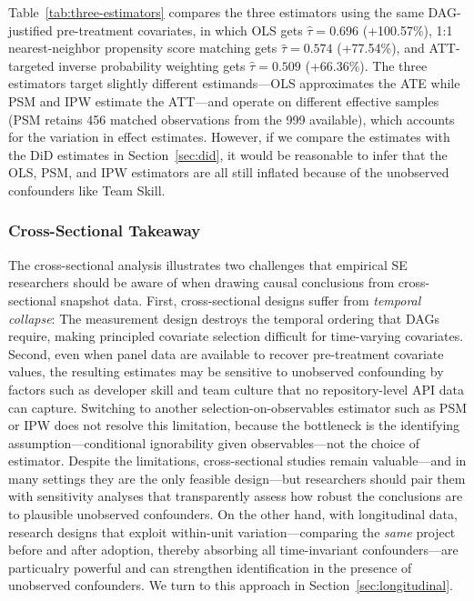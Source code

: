 Table~\ref{tab:three-estimators} compares the three estimators using the same DAG-justified pre-treatment covariates, in which OLS gets $\hat{\tau} = 0.696$ (+100.57\%), 1:1 nearest-neighbor propensity score matching gets $\hat{\tau} = 0.574$ (+77.54\%), and ATT-targeted inverse probability weighting gets $\hat{\tau} = 0.509$ (+66.36\%).
The three estimators target slightly different estimands---OLS approximates the ATE while PSM and IPW estimate the ATT---and operate on different effective samples (PSM retains 456 matched observations from the 999 available), which accounts for the variation in effect estimates.
However, if we compare the estimates with the DiD estimates in Section~\ref{sec:did}, it would be reasonable to infer that the OLS, PSM, and IPW estimators are all still inflated because of the unobserved confounders like Team Skill.

\subsubsection{Cross-Sectional Takeaway}
\label{sec:cross-sectional-takeaway}

The cross-sectional analysis illustrates two challenges that empirical SE researchers should be aware of when drawing causal conclusions from cross-sectional snapshot data.
First, cross-sectional designs suffer from \emph{temporal collapse}: The measurement design destroys the temporal ordering that DAGs require, making principled covariate selection difficult for time-varying covariates.
Second, even when panel data are available to recover pre-treatment covariate values, the resulting estimates may be sensitive to unobserved confounding by factors such as developer skill and team culture that no repository-level API data can capture.
Switching to another selection-on-observables estimator such as PSM or IPW does not resolve this limitation, because the bottleneck is the identifying assumption---conditional ignorability given observables---not the choice of estimator.
Despite the limitations, cross-sectional studies remain valuable---and in many settings they are the only feasible design---but researchers should pair them with sensitivity analyses that transparently assess how robust the conclusions are to plausible unobserved confounders.
On the other hand, with longitudinal data, research designs that exploit within-unit variation---comparing the \emph{same} project before and after adoption, thereby absorbing all time-invariant confounders---are particualry powerful and can strengthen identification in the presence of unobserved confounders.
We turn to this approach in Section~\ref{sec:longitudinal}.

